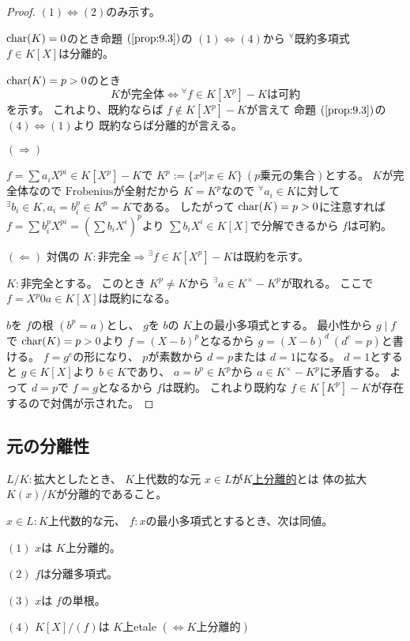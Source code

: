 \documentclass[../master_galois_theory]{subfiles}
\begin{document}
\begin{proof}
  $(1) \Leftrightarrow (2)$のみ示す。

  $\mathrm{char}(K) = 0$のとき命題 $(\mathrm{\ref{prop:9.3}})$の
  $(1) \Leftrightarrow (4)$から ${}^\forall$既約多項式 $f \in K[X]$は分離的。

  $\mathrm{char}(K) = p > 0$のとき
  \[
  Kが完全体 \Leftrightarrow {}^\forall f \in K[X^p] - K は可約
  \]
  を示す。
  これより、既約ならば $f \notin K[X^p] - K$が言えて
  命題 $(\mathrm{\ref{prop:9.3}})$の $(4) \Leftrightarrow (1)$より
  既約ならば分離的が言える。

  $(\Rightarrow)$

  $f = \sum a_i X^{pi} \in K[X^p] - K$で
  $K^p := \{ x^p | x \in K \} \  (p乗元の集合)$とする。
  $K$が完全体なので $\mathrm{Frobenius}$が全射だから
  $K = K^p$なので ${}^\forall a_i \in K$に対して
  ${}^\exists b_i \in K , a_i = b_i^p \in K^p = K$である。
  したがって $\mathrm{char}(K) = p > 0$に注意すれば
  $f = \sum b_i^p X^{pi} = (\sum b_i X^i)^p$より
  $\sum b_i X^i \in K[X]$で分解できるから $f$は可約。

  $(\Leftarrow)$
  対偶の $K:非完全 \Rightarrow {}^\exists f \in K[X^p] - K は既約$を示す。

  $K:$非完全とする。
  このとき $K^p \neq K$から ${}^\exists a \in K^\times - K^p$が取れる。
  ここで $f = X^p 0 a \in K[X]$は既約になる。

  $b$を $f$の根 $(b^p = a)$とし、
  $g$を $b$の $K$上の最小多項式とする。
  最小性から $g \mid f$で $\mathrm{char}(K) = p > 0$より
  $f = (X - b)^p$となるから
  $g = (X - b)^d \  (d^e = p)$と書ける。
  $f = g^e$の形になり、 $p$が素数から
  $d = p$または $d = 1$になる。
  $d = 1$とすると $g \in K[X]$より $b \in K$であり、 $a = b^p \in K^p$から
  $a \in K^\times - K^p$に矛盾する。
  よって $d = p$で $f = g$となるから $f$は既約。
  これより既約な $f \in K[K^p] - K$が存在するので対偶が示された。
\end{proof}

\subsection{元の分離性}

\begin{defi}
  $L/K:$拡大としたとき、
  $K$上代数的な元 $x \in L$が\underline{$K$上分離的}とは
  体の拡大$K(x)/K$が分離的であること。
\end{defi}

\begin{prop} \label{prop:9.5}
  $x \in L:K$上代数的な元、 $f:x$の最小多項式とするとき、次は同値。

  $(1)$
  $x$は $K$上分離的。

  $(2)$
  $f$は分離多項式。

  $(3)$
  $x$は $f$の単根。

  $(4)$
  $K[X]/(f)$は $K$上\rm{etale} $(\Leftrightarrow K上分離的)$
\end{prop}
\end{document}
